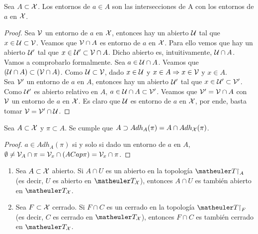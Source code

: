 \begin{lem}
	Sea $A \subset \mathcal{X}$. Los entornos de $a \in A$ son las intersecciones de A con los entornos de $a$ en $\mathcal{X}$.	
\end{lem}
\begin{proof}
	Sea $\mathcal{V}$ un entorno de $a$ en $\mathcal{X}$, entonces hay un abierto $\mathcal{U}$ tal que $x \in \mathcal{U} \subset \mathcal{V}$. Veamos que $\mathcal{V} \cap A$ es entorno de $a$ en $\mathcal{X}$. Para ello vemos que hay un abierto $\mathcal{U}'$ tal que $x \in \mathcal{U}' \subset \mathcal{V} \cap A$. Dicho abierto es, intuitivamente, $\mathcal{U} \cap A$.
	Vamos a comprobarlo formalmente. Sea $a \in \mathcal{U} \cap A$. Veamos que $(\mathcal{U} \cap A) \subset (\mathcal{V} \cap A)$. Como $\mathcal{U} \subset \mathcal{V}$, dado $x \in \mathcal{U} $ y $x \in A \Rightarrow x \in \mathcal{V}$ y $ x \in A$. \\
	
	Sea $\mathcal{V}'$ un entorno de $a$ en $A$, entonces hay un abierto $\mathcal{U}'$ tal que $x \in \mathcal{U}' \subset \mathcal{V}'$. Como $\mathcal{U}'$ es abierto relativo en $A$, $a \in \mathcal{U} \cap A \subset \mathcal{V}'$. Veamos que $\mathcal{V}' = \mathcal{V} \cap A$ con $\mathcal{V}$ un entorno de $a$ en $\mathcal{X}$. Es claro que $\mathcal{U}$ es entorno de $a$ en $\mathcal{X}$, por ende, basta tomar $\mathcal{V} = \mathcal{V}' \cap \mathcal{U}$.
\end{proof}

\begin{prop}
	Sea $A \subset \mathcal{X}$ y $\pi \subset A$. Se cumple que $A \supset Adh_A(\pi) = A \cap Adh_{\mathcal{X}}(\pi)$.
\end{prop}
\begin{proof}
	$a \in Adh_A(\pi)$ si y solo si dado un entorno de $a$ en $A$, $\emptyset \neq \mathcal{V}_A \cap \pi = \mathcal{V}_x \cap (A Cap \pi) = \mathcal{V}_x \cap \pi$.
\end{proof}


\begin{obs}
	\begin{enumerate}
		\item Sea $A\subset\mathcal{X}$ abierto. Si $A\cap U$ es un abierto en la topología $\T\restriction_A$ (es decir, $U$ es abierto en $\T_\X$), entonces $A\cap U$ es también abierto en $\T_\X$.
		\item Sea $F\subset\mathcal{X}$ cerrado. Si $F\cap C$ es un cerrado en la topología $\T\restriction_F$ (es decir, $C$ es cerrado en $\T_\X$), entonces $F\cap C$ es también cerrado en $\T_\X$. \qedhere
	\end{enumerate}
\end{obs}


